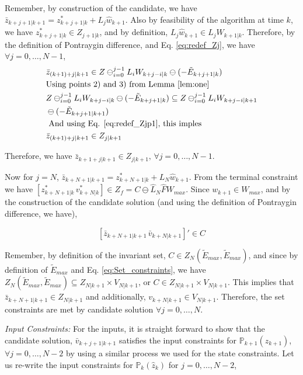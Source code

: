 Remember, by construction of the candidate, we have $\bar{z}_{k+j+1|k+1} = z^{*}_{k+j+1|k} + L_j\hat{w}_{k+1}$.
Also by feasibility of the algorithm at time $k$, we have $z^{*}_{k+j+1|k}\in Z_{j+1|k}$, and by definition, $L_j\hat{w}_{k+1} \in L_j{W}_{k+1|k}$. Therefore, by the definition of Pontraygin difference, and Eq. \ref{eq:redef_Zj}, we have $\forall j=0,\dotsc,N-1$,
\begin{subequations}
\begin{align}
&\bar{z}_{(k+1)+j|k+1} \in Z \ominus_{i=0}^{j-1}L_iW_{k+j-i|k} \ominus (-\tilde{E}_{k+j+1|k}) \\
&\text{Using points 2) and 3) from Lemma \ref{lem:one} } \nonumber \\ 
&Z \ominus_{i=0}^{j-1}L_iW_{k+j-i|k} \ominus (-\tilde{E}_{k+j+1|k}) \subseteq Z \ominus_{i=0}^{j-1}L_iW_{k+j-i|k+1}  \nonumber \\
& \ominus (-\tilde{E}_{k+j+1|k+1}) \\
&\text{ And using Eq. \ref{eq:redef_Zjp1}, this imples } \nonumber \\
&\bar{z}_{(k+1)+j|k+1} \in Z_{j|k+1}
\end{align} 
\end{subequations}

Therefore, we have $\bar{z}_{k+1+j|k+1} \in Z_{j|k+1},\,\forall j=0,\dotsc,N-1$. 

Now for $j=N$, $\bar{z}_{k+N+1|k+1} = z^{*}_{k+N+1|k} + L_N\hat{w}_{k+1}$. From the terminal constraint we have $[z^{*}_{k+N+1|k}\, v^{*}_{k+N|k}] \in Z_f = C \ominus \hat{L}_N\hat{F}W_{max}$. Since $w_{k+1} \in W_{max}$, and by the construction of the candidate solution (and using the definition of Pontraygin difference, we have), 

\begin{equation}
\label{eq:CandidateInC}
[\bar{z}_{k+N+1|k+1}\, \bar{v}_{k+N|k+1}]' \in C
\end{equation}

Remember, by definition of the invariant set, $C \in Z_N(\tilde{E}_{max},\tilde{E}_{max})$, and since by definition of $\tilde{E}_{max}$ and Eq. \ref{eq:Set_constraints}, we have $Z_N(\tilde{E}_{max},\tilde{E}_{max}) \subseteq Z_{N|k+1} \times V_{N|k+1}$, or $C \in  Z_{N|k+1} \times {V}_{N|k+1}$. This implies that $\bar{z}_{k+N+1|k+1} \in Z_{N|k+1}$ and additionally, $v_{k+N|k+1} \in {V}_{N|k+1}$.
Therefore, the set constraints are met by candidate solution $\forall j=0,\dotsc,N$. 

\textit{Input Constraints:} For the inputs, it is straight forward to show that the candidate solution, $\bar{v}_{k+j+1|k+1}$ satisfies the input constraints for $\mathbb{P}_{k+1}(\hat{z}_{k+1}) $, $\forall j=0,\dotsc,N-2$ by using a similar process we used for the state constraints. Let us re-write the input constraints for $\mathbb{P}_{k}(\hat{z}_{k})$ for $j=0,\dotsc,N-2$,

